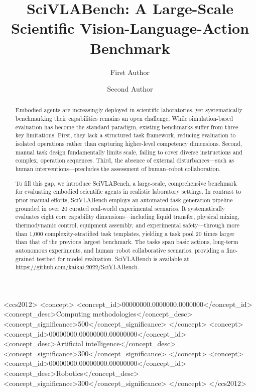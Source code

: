 \documentclass[sigconf]{acmart}
\begin{document}
\title[SciVLABench]{SciVLABench: A Large-Scale Scientific Vision-Language-Action Benchmark}

\author{First Author}

\author{Second Author}

\renewcommand{\shortauthors}{Author et al.}

\begin{abstract}
Embodied agents are increasingly deployed in scientific laboratories, yet systematically benchmarking their capabilities remains an open challenge. While simulation-based evaluation has become the standard paradigm, existing benchmarks suffer from three key limitations. First, they lack a structured task framework, reducing evaluation to isolated operations rather than capturing higher-level competency dimensions. Second, manual task design fundamentally limits scale, failing to cover diverse instructions and complex, operation sequences. Third, the absence of external disturbances---such as human interventions---precludes the assessment of human--robot collaboration.

To fill this gap, we introduce SciVLABench, a large-scale, comprehensive benchmark for evaluating embodied scientific agents in realistic laboratory settings. In contrast to prior manual efforts, SciVLABench employs an automated task generation pipeline grounded in over 20 curated real-world experimental scenarios. It systematically evaluates eight core capability dimensions---including liquid transfer, physical mixing, thermodynamic control, equipment assembly, and experimental safety---through more than 1,000 complexity-stratified task templates, yielding a task pool 20 times larger than that of the previous largest benchmark. The tasks span basic actions, long-term autonomous experiments, and human--robot collaborative scenarios, providing a fine-grained testbed for model evaluation. SciVLABench is available at \url{https://github.com/kaikai-2022/SciVLABench}.
\end{abstract}

\begin{CCSXML}
<ccs2012>
 <concept>
  <concept_id>00000000.0000000.0000000</concept_id>
  <concept_desc>Computing methodologies</concept_desc>
  <concept_significance>500</concept_significance>
 </concept>
 <concept>
  <concept_id>00000000.00000000.00000000</concept_id>
  <concept_desc>Artificial intelligence</concept_desc>
  <concept_significance>300</concept_significance>
 </concept>
 <concept>
  <concept_id>00000000.00000000.00000000</concept_id>
  <concept_desc>Robotics</concept_desc>
  <concept_significance>300</concept_significance>
 </concept>
</ccs2012>
\end{CCSXML}
\end{document}
